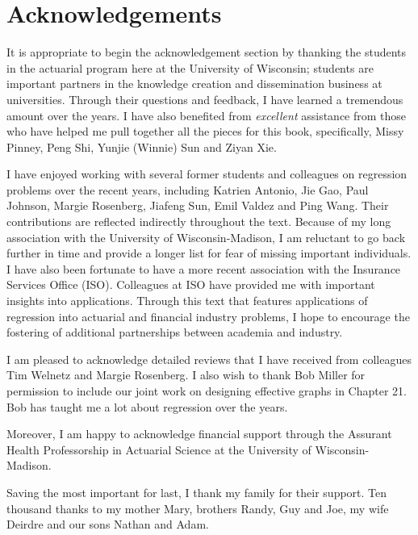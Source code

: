 \section*{Acknowledgements}

It is appropriate to begin the acknowledgement section by thanking
the students in the actuarial program here at the University of
Wisconsin; students are important partners in the knowledge creation
and dissemination business at universities. Through their questions
and feedback, I have learned a tremendous amount over the years. I
have also benefited from \emph{excellent} assistance from those who
have helped me pull together all the pieces for this book,
specifically, Missy Pinney, Peng Shi, Yunjie (Winnie) Sun and Ziyan
Xie.

I have enjoyed working with several former students and colleagues
on regression problems over the recent years, including Katrien
Antonio, Jie Gao, Paul Johnson, Margie Rosenberg, Jiafeng Sun, Emil
Valdez and Ping Wang. Their contributions are reflected indirectly
throughout the text. Because of my long association with the
University of Wisconsin-Madison, I am reluctant to go back further
in time and provide a longer list for fear of missing important
individuals. I have also been fortunate to have a more recent
association with the Insurance Services Office (ISO). Colleagues at
ISO have provided me with important insights into applications.
Through this text that features applications of regression into
actuarial and financial industry problems, I hope to encourage the
fostering of additional partnerships between academia and industry.



I am pleased to acknowledge detailed reviews that I have received
from colleagues Tim Welnetz and Margie Rosenberg. I also wish to
thank Bob Miller for permission to include our joint work on
designing effective graphs in Chapter 21. Bob has taught me a lot
about regression over the years.

Moreover, I am happy to acknowledge financial support through the
Assurant Health Professorship in Actuarial Science at the University
of Wisconsin-Madison.

Saving the most important for last, I thank my family for their
support. Ten thousand thanks to my mother Mary, brothers Randy, Guy
and Joe, my wife Deirdre and our sons Nathan and Adam.
